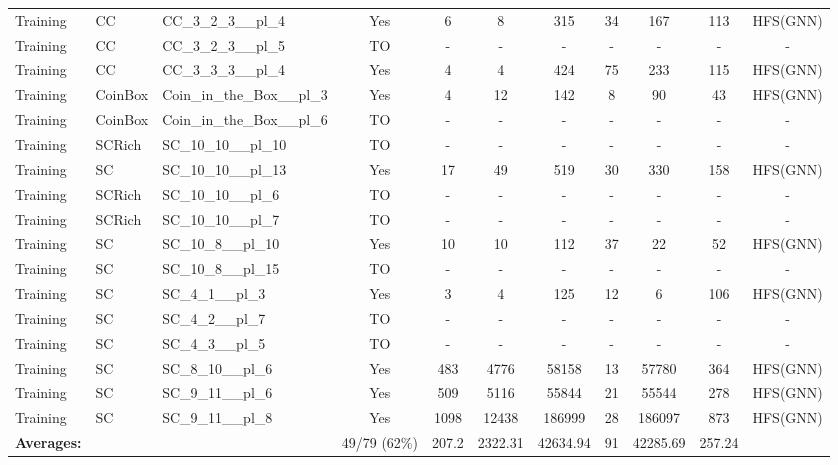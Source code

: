 \documentclass{article}
\begin{document}
\begin{tabular}{lllcccccccc}
Training & CC & CC\_3\_2\_3\_\_pl\_4 & Yes & 6 & 8 & 315 & 34 & 167 & 113 & HFS(GNN) \\
Training & CC & CC\_3\_2\_3\_\_pl\_5 & TO & - & - & - & - & - & - & - \\
Training & CC & CC\_3\_3\_3\_\_pl\_4 & Yes & 4 & 4 & 424 & 75 & 233 & 115 & HFS(GNN) \\
Training & CoinBox & Coin\_in\_the\_Box\_\_pl\_3 & Yes & 4 & 12 & 142 & 8 & 90 & 43 & HFS(GNN) \\
Training & CoinBox & Coin\_in\_the\_Box\_\_pl\_6 & TO & - & - & - & - & - & - & - \\
Training & SCRich & SC\_10\_10\_\_pl\_10 & TO & - & - & - & - & - & - & - \\
Training & SC & SC\_10\_10\_\_pl\_13 & Yes & 17 & 49 & 519 & 30 & 330 & 158 & HFS(GNN) \\
Training & SCRich & SC\_10\_10\_\_pl\_6 & TO & - & - & - & - & - & - & - \\
Training & SCRich & SC\_10\_10\_\_pl\_7 & TO & - & - & - & - & - & - & - \\
Training & SC & SC\_10\_8\_\_pl\_10 & Yes & 10 & 10 & 112 & 37 & 22 & 52 & HFS(GNN) \\
Training & SC & SC\_10\_8\_\_pl\_15 & TO & - & - & - & - & - & - & - \\
Training & SC & SC\_4\_1\_\_pl\_3 & Yes & 3 & 4 & 125 & 12 & 6 & 106 & HFS(GNN) \\
Training & SC & SC\_4\_2\_\_pl\_7 & TO & - & - & - & - & - & - & - \\
Training & SC & SC\_4\_3\_\_pl\_5 & TO & - & - & - & - & - & - & - \\
Training & SC & SC\_8\_10\_\_pl\_6 & Yes & 483 & 4776 & 58158 & 13 & 57780 & 364 & HFS(GNN) \\
Training & SC & SC\_9\_11\_\_pl\_6 & Yes & 509 & 5116 & 55844 & 21 & 55544 & 278 & HFS(GNN) \\
Training & SC & SC\_9\_11\_\_pl\_8 & Yes & 1098 & 12438 & 186999 & 28 & 186097 & 873 & HFS(GNN) \\
\textbf{Averages:} & & & 49/79 (62\%) & 207.2 & 2322.31 & 42634.94 & 91 & 42285.69 & 257.24 & \\
\bottomrule
\end{tabular}
\newpage
\end{document}
